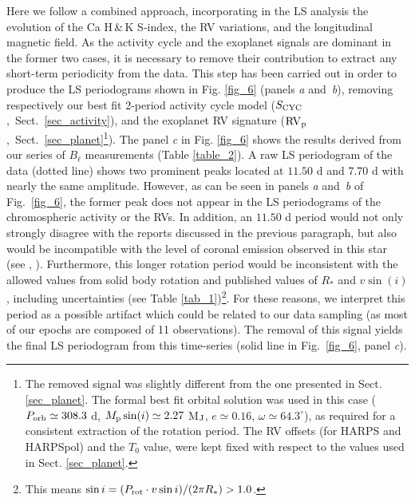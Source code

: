 \documentclass[a4paper,fleqn,usenatbib]{mnras}
\begin{document}
Here we follow a combined approach, incorporating in the LS analysis the evolution of the Ca H\,\&\,K S-index, the RV variations, and the longitudinal magnetic field. As the activity cycle and the exoplanet signals are dominant in the former two cases, it is necessary to remove their contribution to extract any short-term periodicity from the data. This step has been carried out in order to produce the LS periodograms shown in Fig. \ref{fig_6} (panels \textit{a} and~\textit{b}), removing respectively our best fit 2-period activity cycle model ($S_{\rm CYC}$,~Sect.~\ref{sec_activity}), and the exoplanet RV signature (${\rm RV}_{\rm p}$,~Sect.~\ref{sec_planet}\footnote[18]{The removed signal was slightly different from the one presented in Sect. \ref{sec_planet}. The formal best fit orbital solution was used in this case ($P_{\rm orb} \simeq 308.3$ d, $M_{\rm p}\sin(i) \simeq 2.27$ M$_{\rm J}$, $e \simeq 0.16$, $\omega \simeq 64.3^{\circ}$), as required for a consistent extraction of the rotation period. The RV offsets (for HARPS and HARPSpol) and the $T_0$ value, were kept fixed with respect to the values used in Sect. \ref{sec_planet}.}). The panel \textit{c} in Fig. \ref{fig_6} shows the results derived from our series of $B_{\ell}$ measurements (Table \ref{table_2}). A raw LS periodogram of the data (dotted line) shows two prominent peaks located at $11.50$ d and $7.70$ d with nearly the same amplitude. However, as can be seen in panels \textit{a} and~\textit{b} of Fig.~\ref{fig_6}, the former peak does not appear in the LS periodograms of the chromospheric activity or the RVs. In addition, an $11.50$ d period would not only strongly disagree with the reports discussed in the previous paragraph, but also would be incompatible with the level of coronal emission observed in this star (see , ). Furthermore, this longer rotation period would be inconsistent with the allowed values from solid body rotation and published values of $R_{*}$ and $v\sin(i)$, including uncertainties (see Table \ref{tab_1})\footnote[19]{This means $\sin  i = (P_{\rm rot} \cdot v\sin i)/(2\pi R_*) > 1.0$.}. For these reasons, we interpret this period as a possible artifact which could be related to our data sampling (as most of our epochs are composed of 11 observations). The removal of this signal yields the final LS periodogram from this time-series (solid line in Fig.~\ref{fig_6}, panel \textit{c}). 


\end{document}
